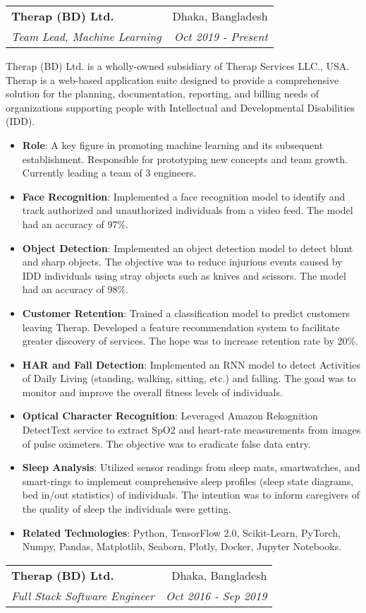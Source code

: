 \documentclass[letterpaper,11pt]{article}
\makeatletter
\newcommand{\resumeItem}[2]{
  \item\small{
    \textbf{#1}{: #2 \vspace{-2pt}}
  }
}
\newcommand{\resumeSubheading}[4]{
  \vspace{-1pt}\item
    \begin{tabular*}{0.97\textwidth}[t]{l@{\extracolsep{\fill}}r}
      \textbf{#1} & #2 \\
      \textit{\small#3} & \textit{\small #4} \\
    \end{tabular*}\vspace{-5pt}
}
\newcommand{\resumeItemListStart}{\begin{itemize}}
\newcommand{\resumeItemListEnd}{\end{itemize}\vspace{-5pt}}
\makeatother
\begin{document}
\resumeSubheading
      {Therap (BD) Ltd.}{Dhaka, Bangladesh}
      {Team Lead, Machine Learning}{Oct 2019 - Present}

      	\begin{flushleft}
			Therap (BD) Ltd. is a wholly-owned subsidiary of Therap Services LLC., USA. Therap is a web-based application suite designed to provide a comprehensive solution for the planning, documentation, reporting, and billing needs of organizations supporting people with Intellectual and Developmental Disabilities (IDD).
      	\end{flushleft}      
      
      \resumeItemListStart
		\resumeItem{Role}{A key figure in promoting machine learning and its subsequent establishment. Responsible for prototyping new concepts and team growth. Currently leading a team of 3 engineers.}
		\resumeItem{Face Recognition}{Implemented a face recognition model to identify and track authorized and unauthorized individuals from a video feed. The model had an accuracy of 97\%.}
		\resumeItem{Object Detection}{Implemented an object detection model to detect blunt and sharp objects. The objective was to reduce injurious events caused by IDD individuals using stray objects such as knives and scissors. The model had an accuracy of 98\%.}
		\resumeItem{Customer Retention}{Trained a classification model to predict customers leaving Therap. Developed a feature recommendation system to facilitate greater discovery of services. The hope was to increase retention rate by 20\%.}
		\resumeItem{HAR and Fall Detection}{Implemented an RNN model to detect Activities of Daily Living (standing, walking, sitting, etc.) and falling. The goad was to monitor and improve the overall fitness levels of individuals.}
		\resumeItem{Optical Character Recognition}{Leveraged Amazon Rekognition DetectText service to extract SpO2 and heart-rate measurements from images of pulse oximeters. The objective was to eradicate false data entry.}
		\resumeItem{Sleep Analysis}{Utilized sensor readings from sleep mats, smartwatches, and smart-rings to implement comprehensive sleep profiles (sleep state diagrams, bed in/out statistics) of individuals. The intention was to inform caregivers of the quality of sleep the individuals were getting.}		
        \resumeItem{Related Technologies}
          {Python, TensorFlow 2.0, Scikit-Learn, PyTorch, Numpy, Pandas, Matplotlib, Seaborn, Plotly, Docker, Jupyter Notebooks.}
      \resumeItemListEnd	
	
    	\resumeSubheading
      		{Therap (BD) Ltd.}{Dhaka, Bangladesh}
      		{Full Stack Software Engineer}{Oct 2016 - Sep 2019}
\end{document}
